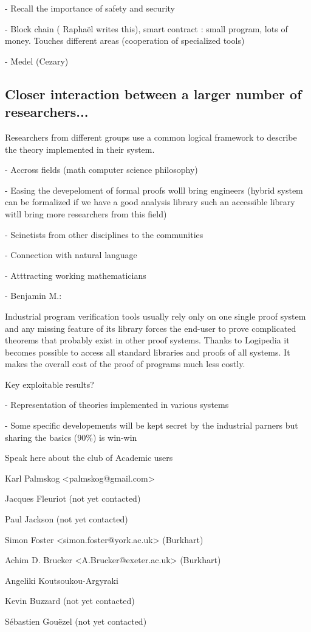 - Recall the importance of safety and security

- Block chain ({\color{red} Raphaël writes this}), smart contract : small program, lots of money. Touches different areas (cooperation of specialized tools)

- Medel (Cezary)



\subsection{Closer interaction between a larger number of researchers...}


Researchers from different groups use a common logical framework to
describe the theory implemented in their system.

- Accross fields (math computer science philosophy)

- Easing the devepeloment of formal proofs wolll bring engineers
(hybrid system can be formalized if we have a good analysis library
such an accessible library witll bring more researchers from this
field)

- Scinetists from other disciplines to the communities

- Connection with natural language 

- Atttracting working mathematicians

- {\color{red} Benjamin M.}:

Industrial program verification tools usually rely only on one single
proof system and any missing feature of its library forces the
end-user to prove complicated theorems that probably exist in other
proof systems. Thanks to {\sf Logipedia} it becomes possible to access all
standard libraries and proofs of all systems. It makes the overall
cost of the proof of programs much less costly.


{\color{red} Key exploitable results?}

- Representation of theories implemented in various systems

- Some specific developements will be kept secret by the industrial parners
but sharing the basics  (90\%) is win-win

{\color{red} Speak here about the club of Academic users

  
Karl Palmskog <palmskog@gmail.com> 

Jacques Fleuriot (not yet contacted)

Paul Jackson (not yet contacted)

Simon Foster <simon.foster@york.ac.uk> (Burkhart)

Achim D. Brucker <A.Brucker@exeter.ac.uk> (Burkhart)

Angeliki Koutsoukou-Argyraki 

Kevin Buzzard (not yet contacted)

Sébastien Gouëzel (not yet contacted)

}





